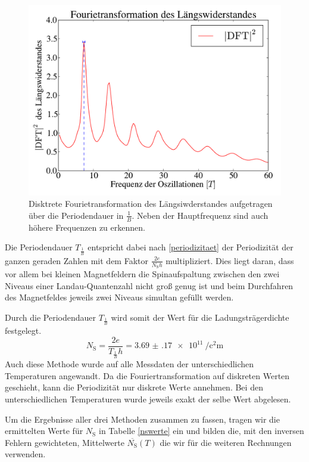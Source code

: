 \documentclass[paper=a4,fontsize=10pt,DIV=18,twocolumn,parskip=half]{scrartcl}
\numberwithin{equation}{section}    %
\newcommand{\kor}[1]{{\color{darkgreen}#1}}
\begin{document}
\begin{figure}[]
	\begin{center}
		\includegraphics[width=\columnwidth]{Data-Plots/06-Fourietransformation.pdf}
		\caption{Disktrete Fourietransformation des Längsiwderstandes aufgetragen über die Periodendauer in $\frac{1}{B}$. Neben der Hauptfrequenz sind auch höhere Frequenzen zu erkennen.}
		\label{fft}
	\end{center}
\end{figure}

Die Periodendauer $T_{\frac{1}{B}}$ entspricht dabei nach \eqref{periodizitaet} der Periodizität der ganzen geraden Zahlen mit dem Faktor $\frac{2 e}{N_\mathrm{S} h}$ multipliziert. Dies liegt daran, dass vor allem bei kleinen Magnetfeldern die Spinaufspaltung zwischen den zwei Niveaus einer Landau-Quantenzahl nicht groß genug ist und beim Durchfahren des Magnetfeldes jeweils zwei Niveaus simultan gefüllt werden.

Durch die Periodendauer $T_{\frac{1}{B}}$ wird somit der Wert für die Ladungsträgerdichte festgelegt.
\kor{
\begin{equation}
N_\mathrm{S}=\frac{2 e}{T_{\frac{1}{B}} h}=\SI{3.69(17)e11}{\per\square\centi\meter}
\label{ns_periode}
\end{equation}
}
Auch diese Methode wurde auf alle Messdaten der unterschiedlichen Temperaturen angewandt. Da die Fouriertransformation auf diskreten Werten geschieht, kann die Periodizität nur diskrete Werte annehmen. Bei den unterschiedlichen Temperaturen wurde jeweils exakt der selbe Wert abgelesen.

Um die Ergebnisse aller drei Methoden zusammen zu fassen, tragen wir die ermittelten Werte für $N_\mathrm{S}$ in Tabelle \ref{nswerte} ein und bilden die, mit den inversen Fehlern gewichteten, Mittelwerte $\overline{N_\mathrm{S}}(T)$ die wir für die weiteren Rechnungen verwenden.
\end{document}
